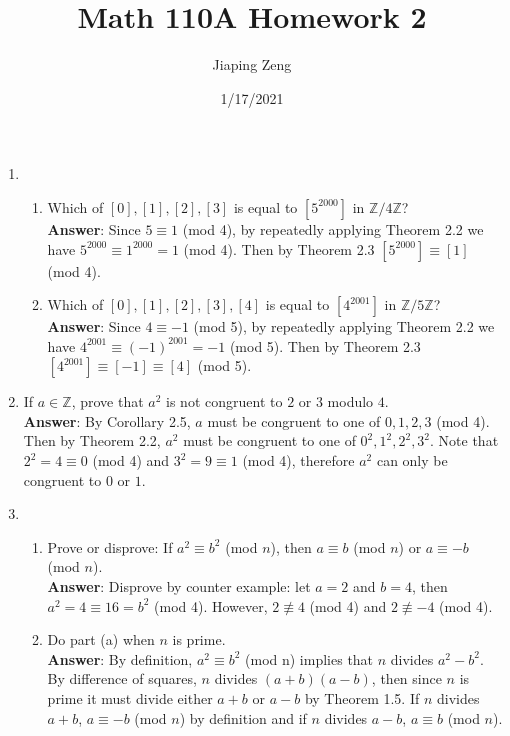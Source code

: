 \documentclass{article}
\title{Math 110A Homework 2}
\date{1/17/2021}
\author{Jiaping Zeng}
\begin{document}
\maketitle

\begin{enumerate}
      \item
            \begin{enumerate}
                  \item Which of $[0],[1],[2],[3]$ is equal to $[5^{2000}]$ in $\mathbb{Z}/4\mathbb{Z}$?\\
                        \textbf{Answer}: Since $5\equiv 1$ (mod 4), by repeatedly applying Theorem 2.2 we have $5^{2000}\equiv 1^{2000}=1$ (mod 4). Then by Theorem 2.3 $[5^{2000}]\equiv [1]$ (mod 4).
                  \item Which of $[0],[1],[2],[3],[4]$ is equal to $[4^{2001}]$ in $\mathbb{Z}/5\mathbb{Z}$?\\
                        \textbf{Answer}: Since $4\equiv -1$ (mod 5), by repeatedly applying Theorem 2.2 we have $4^{2001}\equiv (-1)^{2001}=-1$ (mod 5). Then by Theorem 2.3 $[4^{2001}]\equiv[-1]\equiv[4]$ (mod 5).
            \end{enumerate}
      \item If $a\in\mathbb{Z}$, prove that $a^2$ is not congruent to $2$ or $3$ modulo $4$.\\
            \textbf{Answer}: By Corollary 2.5, $a$ must be congruent to one of $0,1,2,3$ (mod 4). Then by Theorem 2.2, $a^2$ must be congruent to one of $0^2,1^2,2^2,3^2$. Note that $2^2=4\equiv 0$ (mod 4) and $3^2=9\equiv 1$ (mod 4), therefore $a^2$ can only be congruent to $0$ or $1$.
      \item
            \begin{enumerate}
                  \item Prove or disprove: If $a^2\equiv b^2$ (mod $n$), then $a\equiv b$ (mod $n$) or $a\equiv -b$ (mod $n$).\\
                        \textbf{Answer}: Disprove by counter example: let $a=2$ and $b=4$, then $a^2=4\equiv 16=b^2$ (mod 4). However, $2\not\equiv 4$ (mod 4) and $2\not\equiv -4$ (mod 4).
                  \item Do part (a) when $n$ is prime.\\
                        \textbf{Answer}: By definition, $a^2\equiv b^2$ (mod n) implies that $n$ divides $a^2-b^2$. By difference of squares, $n$ divides $(a+b)(a-b)$, then since $n$ is prime it must divide either $a+b$ or $a-b$ by Theorem 1.5. If $n$ divides $a+b$, $a\equiv -b$ (mod $n$) by definition and if $n$ divides $a-b$, $a\equiv b$ (mod $n$).

\end{enumerate}
\end{enumerate}
\end{document}
